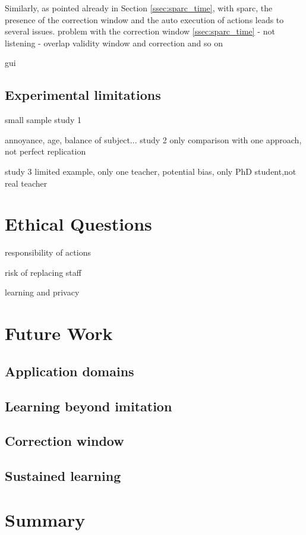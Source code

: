 Similarly, as pointed already in Section \ref{ssec:sparc_time}, with \gls{sparc}, the presence of the correction window and the auto execution of actions leads to several issues.
problem with the correction window \ref{ssec:sparc_time} - not listening - overlap validity window and correction and so on

gui

\subsection{Experimental limitations} \label{sec:disc_experiments}

small sample study 1

annoyance, age, balance of subject... study 2
only comparison with one approach, not perfect replication

study 3 limited example, only one teacher, potential bias, only PhD student,not real teacher

\section{Ethical Questions} \label{sec:disc_ethics}

responsibility of actions

risk of replacing staff

learning and privacy

\section{Future Work}

\subsection{Application domains}

\subsection{Learning beyond imitation}

\subsection{Correction window}

\subsection{Sustained learning}

\section{Summary} \label{sec:disc_summary}
